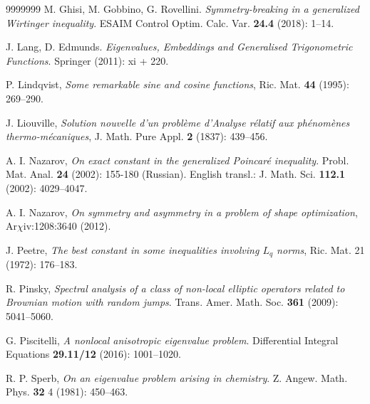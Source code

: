 \documentclass{amsart}
\theoremstyle{definition}
\theoremstyle{remark}
\begin{document}
\begin{thebibliography}{9999999}
 M. Ghisi, M. Gobbino, G. Rovellini. \textit{Symmetry-breaking in a generalized Wirtinger inequality}. ESAIM Control Optim. Calc. Var.  \textbf{24.4} (2018): 1--14.



 J. Lang, D. Edmunds. \textit{Eigenvalues, Embeddings and Generalised Trigonometric Functions}. Springer (2011): xi + 220.

 P. Lindqvist, \textit{Some remarkable sine and cosine functions}, Ric. Mat. \textbf{44} (1995): 269--290.

 J. Liouville, \textit{Solution nouvelle d'un probl\`{e}me d'Analyse r\'{e}latif aux ph\'{e}nom\`{e}nes thermo-m\'{e}caniques}, J. Math. Pure Appl. {\bf 2} (1837): 439--456.

 A. I. Nazarov, \textit{On exact constant in the generalized Poincar\'e inequality}. Probl. Mat. Anal. \textbf{24} (2002): 155-180 (Russian). English transl.: J. Math. Sci. \textbf{112.1} (2002): 4029--4047.

 A. I. Nazarov, \textit{On symmetry and asymmetry in a problem of shape optimization}, Ar$\chi$iv:1208:3640 (2012).

 J. Peetre, \textit{The best constant in some inequalities involving $L_q$ norms}, Ric. Mat. 21 (1972): 176--183.

 R. Pinsky, \textit{Spectral analysis of a class of non-local elliptic operators related to Brownian motion with random jumps}. Trans. Amer. Math. Soc. \textbf{361} (2009): 5041--5060. 

 G. Piscitelli, \textit{A nonlocal anisotropic eigenvalue problem}. Differential Integral Equations \textbf{29.11/12} (2016): 1001--1020.


 R. P. Sperb, \textit{On an eigenvalue problem arising in chemistry}. Z. Angew. Math. Phys. \textbf{32} 4 (1981): 450--463.

\end{thebibliography}
\end{document}
